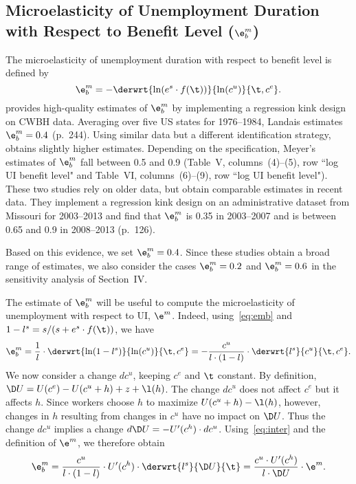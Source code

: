 \documentclass[letterpaper,12pt,leqno]{article}
\begin{document}
\subsection[Microelasticity of Unemployment Duration with Respect to Benefit Level ($\e^m_b$)]{\hspace*{-0.7cm}Microelasticity of Unemployment Duration with Respect to Benefit Level ($\e^m_b$)}

The microelasticity of unemployment duration with respect to benefit level is defined by
\begin{equation}
\e^{m}_{b}  =  -\derwrt{\ln(e^{s}\cdot f(\t))}{\ln(c^{u})}{\t, c^{e}}.
\label{eq:emb}\end{equation}
\citet{L11} provides high-quality estimates of $\e^{m}_{b}$ by implementing a regression kink design on CWBH data. Averaging over five US states for 1976--1984, Landais estimates $\e^m_b=0.4$ (p.~244). Using similar data but a different identification strategy, \citet{M90} obtains slightly higher estimates. Depending on the specification, Meyer's estimates of $\e^{m}_{b}$ fall between 0.5 and 0.9 (Table~V, columns~(4)--(5), row ``log UI benefit level" and Table~VI, columns~(6)--(9), row ``log UI benefit level"). These two studies rely on older data, but \citet{CJL15} obtain comparable estimates in recent data. They implement a regression kink design on an administrative dataset from Missouri for 2003--2013 and find that $\e^{m}_{b}$ is 0.35 in 2003--2007 and is between 0.65 and 0.9 in 2008--2013 (p.~126).

Based on this evidence, we set $\e^{m}_{b}=0.4$. Since these studies obtain a broad range of estimates, we also consider the cases $\e^{m}_{b}=0.2$ and $\e^{m}_{b}=0.6$ in the sensitivity analysis of Section~IV.

The estimate of $\e^{m}_{b}$ will be useful to compute the microelasticity of unemployment with respect to UI, $\e^{m}$. Indeed, using~\eqref{eq:emb} and $1-l^{s}=s/(s+e^{s}\cdot f(\t))$, we have
\begin{equation}
\e^{m}_{b}= \frac{1}{l}\cdot\derwrt{\ln(1-l^{s})}{\ln(c^{u})}{\t, c^{e}}=-\frac{c^{u}}{l\cdot (1-l)}\cdot\derwrt{l^{s}}{c^{u}}{\t, c^{e}}.
\label{eq:inter}\end{equation}
We now consider a change $dc^{u}$, keeping $c^{e}$ and $\t$ constant. By definition, $\D U=U(c^{e})-U(c^{u}+h)+z+\l(h)$. The change $dc^{u}$ does not affect $c^{e}$ but it affects $h$. Since workers choose $h$ to maximize $U(c^{u}+h)-\l(h)$, however, changes in $h$ resulting from changes in $c^{u}$ have no impact on $\D U$. Thus the change $dc^{u}$ implies a  change $d\D U= -U'(c^{h})\cdot dc^{u}$. Using~\eqref{eq:inter} and the definition of $\e^m$, we therefore obtain
\begin{equation}
\e^{m}_{b} = \frac{c^{u}}{l\cdot (1-l)}\cdot U'(c^{h})\cdot \derwrt{l^{s}}{\D U}{\t} = \frac{c^{u} \cdot U'(c^h)}{l\cdot \D U} \cdot \e^m.
\label{eq:interem}\end{equation}
\end{document}
